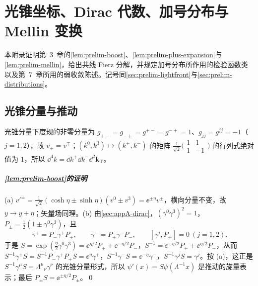 \chapter{光锥坐标、Dirac 代数、加号分布与 Mellin 变换}\label{app:appA}

本附录证明第~3~章的\cref{lem:prelim-boost}、\cref{lem:prelim-plus-expansion}与\cref{lem:prelim-mellin}，给出共线 Fierz 分解，并规定加号分布所作用的检验函数类以及第~7~章所用的弱收敛陈述。记号同\cref{sec:prelim-lightfront}与\cref{sec:prelim-distributions}。

\section{光锥分量与推动}\label{sec:appA-lightfront}

光锥分量下度规的非零分量为 $g_{+-}=g_{-+}=g^{+-}=g^{-+}=1$、$g_{jj}=g^{jj}=-1$（$j=1,2$），故 $v_\pm=v^\mp$；$(k^0,k^3)\mapsto(k^+,k^-)$ 的矩阵 $\frac1{\sqrt2}\big(\begin{smallmatrix}1&1\\1&-1\end{smallmatrix}\big)$ 的行列式绝对值为 $1$，所以 $\dd^4k=\dd k^+\dd k^-\dd^2\mathbf k_{\mathrm T}$。

\paragraph{\cref{lem:prelim-boost}的证明}
(a) $v'^\pm=\frac1{\sqrt2}(\cosh\eta\pm\sinh\eta)(v^0\pm v^3)=\ee^{\pm\eta}v^\pm$，横向分量不变，故 $y\to y+\eta$；矢量场同理。(b) 由\cref{sec:appA-dirac}，$(\gamma^0\gamma^3)^2=1$，$P_\pm=\frac12(1\pm\gamma^0\gamma^3)$，且
\begin{equation}\label{eq:appA-gpm-proj}
\gamma^+=P_-\gamma^+P_+,\qquad \gamma^-=P_+\gamma^-P_-,\qquad [\gamma^j,P_\pm]=0\ (j=1,2).
\end{equation}
于是 $S=\exp(\frac\eta2\gamma^0\gamma^3)=\ee^{\eta/2}P_++\ee^{-\eta/2}P_-$，$S^{-1}=\ee^{-\eta/2}P_++\ee^{\eta/2}P_-$，从而 $S^{-1}\gamma^+S=S^{-1}P_-\gamma^+P_+S=\ee^{\eta}\gamma^+$，$S^{-1}\gamma^-S=\ee^{-\eta}\gamma^-$，$S^{-1}\gamma^jS=\gamma^j$。按 (a)，这正是 $S^{-1}\gamma^\mu S=\Lambda^\mu{}_\nu\gamma^\nu$ 的光锥分量形式，所以 $\psi'(x)=S\psi(\Lambda^{-1}x)$ 是推动的旋量表示；最后 $P_\pm S=\ee^{\pm\eta/2}P_\pm$。\qed

